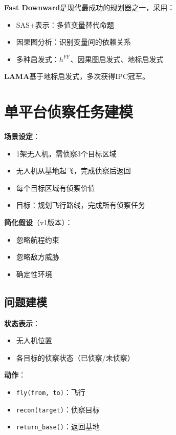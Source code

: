 \textbf{Fast Downward}是现代最成功的规划器之一，采用：
\begin{itemize}[leftmargin=2em]
  \item SAS+表示：多值变量替代命题
  \item 因果图分析：识别变量间的依赖关系
  \item 多种启发式：$h^{\text{FF}}$、因果图启发式、地标启发式
\end{itemize}

\textbf{LAMA}基于地标启发式，多次获得IPC冠军。

\section{单平台侦察任务建模}

\begin{caseboxB}
\textbf{场景设定}：
\begin{itemize}
  \item 1架无人机，需侦察3个目标区域
  \item 无人机从基地起飞，完成侦察后返回
  \item 每个目标区域有侦察价值
  \item 目标：规划飞行路线，完成所有侦察任务
\end{itemize}

\textbf{简化假设}（v1版本）：
\begin{itemize}
  \item 忽略航程约束
  \item 忽略敌方威胁
  \item 确定性环境
\end{itemize}
\end{caseboxB}

\subsection{问题建模}

\textbf{状态表示}：
\begin{itemize}[leftmargin=2em]
  \item 无人机位置
  \item 各目标的侦察状态（已侦察/未侦察）
\end{itemize}

\textbf{动作}：
\begin{itemize}[leftmargin=2em]
  \item \texttt{fly(from, to)}：飞行
  \item \texttt{recon(target)}：侦察目标
  \item \texttt{return\_base()}：返回基地
\end{itemize}

